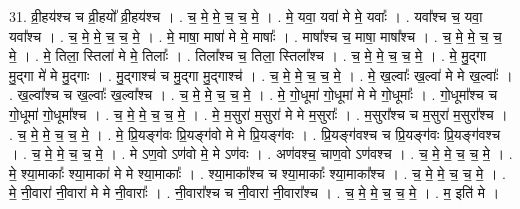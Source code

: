 \documentclass[17pt]{extarticle}
\begin{document}
31. व्री॒हय॑श्च च व्री॒हयो᳚ व्री॒हय॑श्च । . च॒ मे॒ मे॒ च॒ च॒ मे॒ । . मे॒ यवा॒ यवा॑ मे मे॒ यवाः᳚ । . यवा᳚श्च च॒ यवा॒ यवा᳚श्च । . च॒ मे॒ मे॒ च॒ च॒ मे॒ । . मे॒ माषा॒ माषा॑ मे मे॒ माषाः᳚ । . माषा᳚श्च च॒ माषा॒ माषा᳚श्च । . च॒ मे॒ मे॒ च॒ च॒ मे॒ । . मे॒ तिला॒ स्तिला॑ मे मे॒ तिलाः᳚ । . तिला᳚श्च च॒ तिला॒ स्तिला᳚श्च । . च॒ मे॒ मे॒ च॒ च॒ मे॒ । . मे॒ मु॒द्‍गा मु॒द्‍गा मे॑ मे मु॒द्‍गाः । . मु॒द्‍गाश्च॑ च मु॒द्‍गा मु॒द्‍गाश्च॑ । . च॒ मे॒ मे॒ च॒ च॒ मे॒ । . मे॒ ख॒ल्वाः᳚ ख॒ल्वा॑ मे मे ख॒ल्वाः᳚ । . ख॒ल्वा᳚श्च च ख॒ल्वाः᳚ ख॒ल्वा᳚श्च । . च॒ मे॒ मे॒ च॒ च॒ मे॒ । . मे॒ गो॒धूमा॑ गो॒धूमा॑ मे मे गो॒धूमाः᳚ । . गो॒धूमा᳚श्च च गो॒धूमा॑ गो॒धूमा᳚श्च । . च॒ मे॒ मे॒ च॒ च॒ मे॒ । . मे॒ म॒सुरा॑ म॒सुरा॑ मे मे म॒सुराः᳚ । . म॒सुरा᳚श्च च म॒सुरा॑ म॒सुरा᳚श्च । . च॒ मे॒ मे॒ च॒ च॒ मे॒ । . मे॒ प्रि॒यङ्ग॑वः प्रि॒यङ्ग॑वो मे मे प्रि॒यङ्ग॑वः । . प्रि॒यङ्ग॑वश्च च प्रि॒यङ्ग॑वः प्रि॒यङ्ग॑वश्च । . च॒ मे॒ मे॒ च॒ च॒ मे॒ । . मे ऽण॒वो ऽण॑वो मे॒ मे ऽण॑वः । . अण॑वश्च॒ चाण॒वो ऽण॑वश्च । . च॒ मे॒ मे॒ च॒ च॒ मे॒ । . मे॒ श्या॒माकाः᳚ श्या॒माका॑ मे मे श्या॒माकाः᳚ । . श्या॒माका᳚श्च च श्या॒माकाः᳚ श्या॒माका᳚श्च । . च॒ मे॒ मे॒ च॒ च॒ मे॒ । . मे॒ नी॒वारा॑ नी॒वारा॑ मे मे नी॒वाराः᳚ । . नी॒वारा᳚श्च च नी॒वारा॑ नी॒वारा᳚श्च । . च॒ मे॒ मे॒ च॒ च॒ मे॒ । . म॒ इति॑ मे । \newline
\end{document}
